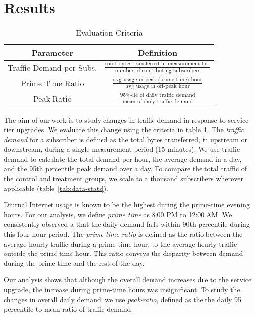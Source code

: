 \section{Results}\label{sec:analysis}

\begin{table}[t]
\begin{tabular}{| c | c |}\hline
\textbf{Parameter} & \textbf{Definition}	\\\hline
Traffic Demand per Subs.& \(\frac{\text{total bytes transferred in 
measurement int.}}{\text{number of contributing subscribers}}\)	\\
Prime Time Ratio 	& \( \frac{ \text{avg usage in peak (prime-time) 
hour}}{ \text{avg usage in off-peak hour}}\) 		\\
Peak Ratio 		& \(\frac{\text{95\%-ile of daily traffic 
demand}}{\text{mean of daily traffic demand}}\)	\\\hline
\end{tabular}
\caption{Evaluation Criteria}
\label{tab:eval-criteria}
\end{table}

The aim of our work is to study changes in
traffic demand in response to service tier upgrades. We evaluate this
change using the criteria in table~\ref{tab:eval-criteria}. The \emph{traffic 
demand} for a subscriber is defined as the total bytes transferred, in 
upstream or downstream, during a single measurement period (15 minutes).
We use traffic demand to calculate the total demand per hour, the average demand 
in a day, and the 95th percentile peak demand over a day. To compare the total
traffic of the control and treatment groups, we scale to a thousand subscribers
wherever applicable (table~\ref{tab:data-stats}).

Diurnal Internet usage is known to be the highest during the prime-time evening 
hours. For our analysis, we define \emph{prime time} as 8:00 PM to 12:00 AM.
We consistently observed a that the daily demand falls within 90th percentile
during this four hour period. The \emph{prime-time ratio} is defined as the
ratio between the average hourly traffic during a
prime-time hour, to the average hourly traffic outside the prime-time hour.
This ratio conveys the disparity between demand during the prime-time and
the rest of the day.

Our analysis shows that although the overall demand increases due to the 
service upgrade, the increase during prime-time hours was insignificant. 
To study the changes in overall daily demand, we use \emph{peak-ratio},
defined as the the daily 95 percentile to mean ratio of traffic demand.







%